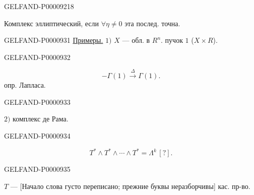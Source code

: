 \begin{GelfandAdjacentEvidence}{GELFAND-P000092}{18}

Комплекс эллиптический, если $\forall\eta\ne0$ эта послед. точна.
\end{GelfandAdjacentEvidence}




\begin{GelfandAdjacentEvidence}{GELFAND-P000093}{1}
\underline{Примеры.} $1)$ $X$ — обл. в $R^n$.
пучок $1$ ($X\times R$).
\end{GelfandAdjacentEvidence}
\begin{GelfandAdjacentEvidence}{GELFAND-P000093}{2}

\begin{equation*}-\Gamma(1)\overset\Delta\longrightarrow\Gamma(1).\end{equation*}
опр. Лапласа.
\end{GelfandAdjacentEvidence}
\begin{GelfandAdjacentEvidence}{GELFAND-P000093}{3}

$2)$ комплекс де Рама.
\end{GelfandAdjacentEvidence}
\begin{GelfandAdjacentEvidence}{GELFAND-P000093}{4}

\begin{equation*}T^*\wedge T^*\wedge\cdots\wedge T^*=\Lambda^{k}\,[?].\end{equation*}
\end{GelfandAdjacentEvidence}
\begin{GelfandAdjacentEvidence}{GELFAND-P000093}{5}

$T$ —
[Начало слова густо переписано; прежние буквы неразборчивы] кас. пр-во.

\end{GelfandAdjacentEvidence}
